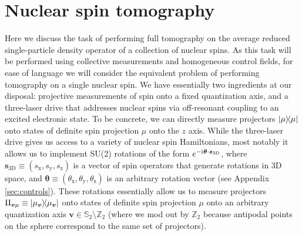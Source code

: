 \documentclass[nofootinbib,notitlepage,11pt]{revtex4-2}
\renewcommand{\t}{\text} %
\newcommand{\p}[1]{\left(#1\right)} %
\renewcommand{\v}{\bm} %
\renewcommand{\c}{\cdot} %
\renewcommand{\i}{\mathrm{i}\mkern1mu} %
\newcommand{\1}{\mathds{1}}
\newcommand{\x}{\text{x}}
\newcommand{\y}{\text{y}}
\newcommand{\z}{\text{z}}
\renewcommand{\SS}{\mathbb{S}}
\newcommand{\ZZ}{\mathbb{Z}}
\begin{document}
\section{Nuclear spin tomography}
\label{sec:tomography}

Here we discuss the task of performing full tomography on the average reduced single-particle density operator of a collection of nuclear spins.
As this task will be performed using collective measurements and homogeneous control fields, for ease of language we will consider the equivalent problem of performing tomography on a single nuclear spin.
We have essentially two ingredients at our disposal: projective measurements of spin onto a fixed quantization axis, and a three-laser drive that addresses nuclear spins via off-resonant coupling to an excited electronic state.
To be concrete, we can directly measure projectors $\op{\mu}$ onto states of definite spin projection $\mu$ onto the $z$ axis.
While the three-laser drive gives us access to a variety of nuclear spin Hamiltonians, most notably it allows us to implement SU(2) rotations of the form $e^{-\i\v\theta\c\v s_{\t{3D}}}$, where $\v s_{\t{3D}}\equiv\p{s_\x,s_\y,s_\z}$ is a vector of spin operators that generate rotations in 3D space, and $\v\theta\equiv\p{\theta_\x,\theta_\y,\theta_\z}$ is an arbitrary rotation vector (see Appendix \ref{sec:controls}).
These rotations essentially allow us to measure projectors $\Pi_{\v v\mu} \equiv \op{\mu_{\v v}}$ onto states of definite spin projection $\mu$ onto an arbitrary quantization axis $\v v\in\SS_2\setminus\ZZ_2$ (where we mod out by $\ZZ_2$ because antipodal points on the sphere correspond to the same set of projectors).
\end{document}
